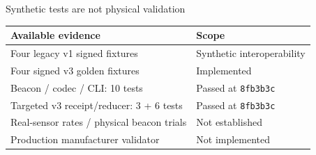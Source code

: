 \begin{frame}[noframenumbering]{Synthetic tests are not physical validation}
\renewcommand{\arraystretch}{1.3}
\begin{tabular}{@{}>{\raggedright\arraybackslash}p{6.8cm}>{\raggedright\arraybackslash}p{5.9cm}@{}}
\textbf{Available evidence} & \textbf{Scope}\\\hline
Four legacy v1 signed fixtures & Synthetic interoperability\\
Four signed v3 golden fixtures & Implemented\\
Beacon / codec / CLI: 10 tests & Passed at \texttt{8fb3b3c}\\
Targeted v3 receipt/reducer: 3 + 6 tests & Passed at \texttt{8fb3b3c}\\
Real-sensor rates / physical beacon trials & Not established\\
Production manufacturer validator & Not implemented\\
\end{tabular}\par
\vfill
{}
\end{frame}

\endgroup
